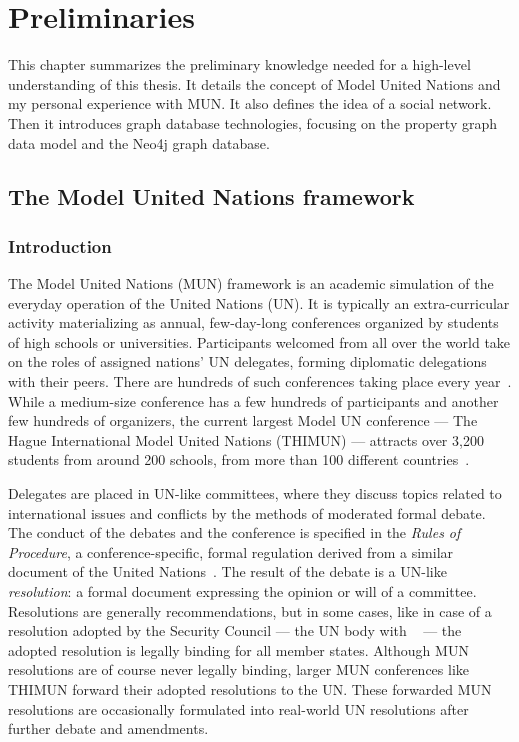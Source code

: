 \chapter{Preliminaries}
\label{chapter:preliminaries}

This chapter summarizes the preliminary knowledge needed for a high-level understanding of this thesis. It details the concept of Model United Nations and my personal experience with MUN. It also defines the idea of a social network. Then it introduces graph database technologies, focusing on the property graph data model and the Neo4j graph database.

\section{The Model United Nations framework}
\label{section:munframework}

\subsection{Introduction}

The Model United Nations (MUN) framework is an academic simulation of the everyday operation of the United Nations (UN). It is typically an extra-curricular activity materializing as annual, few-day-long conferences organized by students of high schools or universities. Participants welcomed from all over the world take on the roles of assigned nations' UN delegates, forming diplomatic delegations with their peers. There are hundreds of such conferences taking place every year~\cite{mymunconferencelist}. While a medium-size conference has a few hundreds of participants and another few hundreds of organizers, the current largest Model UN conference — The Hague International Model United Nations (THIMUN) — attracts over 3,200 students from around 200 schools, from more than 100 different countries~\cite{thimunabout}.

Delegates are placed in UN-like committees, where they discuss topics related to international issues and conflicts by the methods of moderated formal debate. The conduct of the debates and the conference is specified in the \emph{Rules of Procedure}, a conference-specific, formal regulation derived from a similar document of the United Nations~\cite{unmunrop}. The result of the debate is a UN-like \emph{resolution}: a formal document expressing the opinion or will of a committee. Resolutions are generally recommendations, but in some cases, like in case of a resolution adopted by the Security Council — the UN body with ~\cite{uncharter} — the adopted resolution is legally binding for all member states. Although MUN resolutions are of course never legally binding, larger MUN conferences like THIMUN forward their adopted resolutions to the UN. These forwarded MUN resolutions are occasionally formulated into real-world UN resolutions after further debate and amendments.

